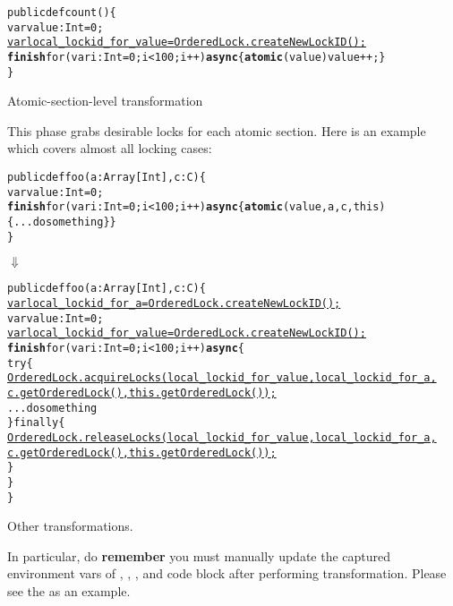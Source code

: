 \documentclass{article}
\begin{document}
\begin{enumerate}
\begin{CodeOut}
\begin{alltt}
public def count() \{
    var value:Int = 0;
    \underline{var local\_lockid\_for\_value = OrderedLock.createNewLockID();}
    \textbf{finish} for (var i:Int = 0; i < 100; i++) \textbf{async} \{ \textbf{atomic}(value) value ++; \}
\}
\end{alltt}
\end{CodeOut}


\Item Atomic-section-level transformation

This phase grabs desirable locks for each atomic section.  Here is an example which covers almost all locking cases:

\begin{CodeOut}
\begin{alltt}
public def foo(a:Array[Int], c:C) \{
    var value:Int = 0;
    \textbf{finish} for (var i:Int = 0; i < 100; i++) \textbf{async} \{ \textbf{atomic}(value, a, c, this) \{ ... do something\} \}
\}
\end{alltt}
\end{CodeOut}

\hspace{10mm}$\Downarrow$

\begin{CodeOut}
\begin{alltt}
public def foo(a:Array[Int], c:C) \{
    \underline{var local\_lockid\_for\_a = OrderedLock.createNewLockID();}    
    var value:Int = 0;
    \underline{var local\_lockid\_for\_value = OrderedLock.createNewLockID();}
    \textbf{finish} for (var i:Int = 0; i < 100; i++) \textbf{async} \{
        try \{
             \underline{OrderedLock.acquireLocks( local\_lockid\_for\_value,  local\_lockid\_for\_a, }
                \underline{c.getOrderedLock(), this.getOrderedLock());}
             ...do something
        \} finally \{
              \underline{OrderedLock.releaseLocks(local\_lockid\_for\_value,  local\_lockid\_for\_a, }
                \underline{c.getOrderedLock(), this.getOrderedLock());}
        \}
   \}
\}
\end{alltt}
\end{CodeOut}

\Item Other transformations.

In particular, do \textbf{remember}  you must manually update the captured environment vars of , , , and  code block after performing transformation. Please see the  as an example.

\end{enumerate}
\end{document}
